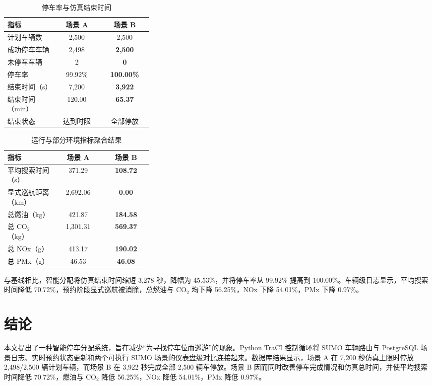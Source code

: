 \documentclass[conference]{IEEEtran}
\begin{document}
\begin{table}[htbp]
    \caption{停车率与仿真结束时间}
    \label{tab:run_metrics}
    \centering
    \footnotesize
    \begin{tabular}{|p{0.34\linewidth}|c|c|}
        \hline
        \textbf{指标} & \textbf{场景 A} & \textbf{场景 B} \\
        \hline
        计划车辆数 & 2,500 & 2,500 \\
        成功停车车辆 & 2,498 & \textbf{2,500} \\
        未停车车辆 & 2 & \textbf{0} \\
        停车率 & 99.92\% & \textbf{100.00\%} \\
        结束时间（s） & 7,200 & \textbf{3,922} \\
        结束时间（min） & 120.00 & \textbf{65.37} \\
        结束状态 & 达到时限 & 全部停放 \\
        \hline
    \end{tabular}
\end{table}

\begin{table}[htbp]
    \caption{运行与部分环境指标聚合结果}
    \label{tab:vehicle_metrics}
    \centering
    \footnotesize
    \begin{tabular}{|p{0.34\linewidth}|c|c|}
        \hline
        \textbf{指标} & \textbf{场景 A} & \textbf{场景 B} \\
        \hline
        平均搜索时间（s） & 371.29 & \textbf{108.72} \\
        显式巡航距离（km） & 2,692.06 & \textbf{0.00} \\
        总燃油（kg） & 421.87 & \textbf{184.58} \\
        总 CO$_2$（kg） & 1,301.31 & \textbf{569.37} \\
        总 NOx（g） & 413.17 & \textbf{190.02} \\
        总 PMx（g） & 46.53 & \textbf{46.08} \\
        \hline
    \end{tabular}
\end{table}

与基线相比，智能分配将仿真结束时间缩短 3,278 秒，降幅为 45.53\%，并将停车率从 99.92\% 提高到 100.00\%。车辆级日志显示，平均搜索时间降低 70.72\%，预约阶段显式巡航被消除，总燃油与 CO$_2$ 均下降 56.25\%，NOx 下降 54.01\%，PMx 下降 0.97\%。

\section{结论}
本文提出了一种智能停车分配系统，旨在减少“为寻找停车位而巡游”的现象。Python TraCI 控制循环将 SUMO 车辆路由与 PostgreSQL 场景日志、实时预约状态更新和两个可执行 SUMO 场景的仪表盘级对比连接起来。数据库结果显示，场景 A 在 7,200 秒仿真上限时停放 2,498/2,500 辆计划车辆，而场景 B 在 3,922 秒完成全部 2,500 辆车停放。场景 B 因而同时改善停车完成情况和仿真总时间，并使平均搜索时间降低 70.72\%，燃油与 CO$_2$ 降低 56.25\%，NOx 降低 54.01\%，PMx 降低 0.97\%。
\end{document}
